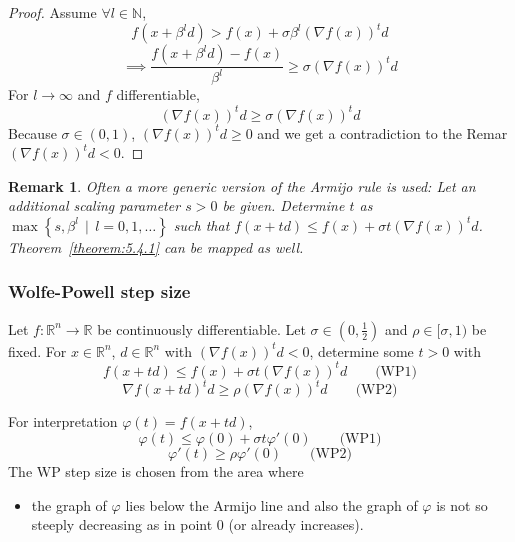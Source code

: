 \documentclass[a4paper]{article}
\numberwithin{lecref}{subsection}
\newtheorem*{Remark}{Remark}
\newcommand{\SetDef}[2]{\left\{#1\,\mid\,#2\right\}}
\begin{document}
\begin{proof}
	Assume $\forall l \in \mathbb N$,
	\[ f(x + \beta^l d) > f(x) + \sigma \beta^l\left(\nabla f(x)\right)^t d \]
	\[ \implies \frac{f(x + \beta^l d) - f(x)}{\beta^l} \geq \sigma \left(\nabla f(x)\right)^t d \]
	For $l \to \infty$ and $f$ differentiable,
	\[ (\nabla f(x))^t d \geq \sigma (\nabla f(x))^t d \]
	Because $\sigma \in (0, 1)$, $(\nabla f(x))^t d \geq 0$ and we get a contradiction to the Remar $(\nabla f(x))^t d < 0$.
\end{proof}

\begin{Remark}
	Often a more generic version of the Armijo rule is used: Let an additional scaling parameter $s > 0$ be given.
	Determine $t$ as $\max\SetDef{s, \beta^l}{l = 0, 1, \dots}$ such that $f(x + td) \leq f(x) + \sigma t\left(\nabla f(x)\right)^t d$.
	Theorem~\ref{theorem:5.4.1} can be mapped as well.
\end{Remark}

\subsubsection{Wolfe-Powell step size}
\label{section:5.4.2}

Let $f: \mathbb R^n \to \mathbb R$ be continuously differentiable. Let $\sigma \in (0, \frac12)$ and $\rho \in [\sigma, 1)$ be fixed.
For $x \in \mathbb R^n$, $d \in \mathbb R^n$ with $\left(\nabla f(x)\right)^t d < 0$, determine some $t > 0$ with
\[ f(x + td) \leq f(x) + \sigma t \left(\nabla f(x)\right)^t d \qquad \text{(WP1)} \]
\[ \nabla f(x + td)^t d \geq \rho \left(\nabla f(x)\right)^t d \qquad \text{(WP2)} \]

For interpretation $\varphi(t) = f(x + td)$,
\[ \varphi(t) \leq \varphi(0) + \sigma t \varphi'(0) \qquad \text{(WP1)} \]
\[ \varphi'(t) \geq \rho \varphi'(0) \qquad \text{(WP2)} \]
The WP step size is chosen from the area where
\begin{itemize}
	\item the graph of $\varphi$ lies below the Armijo line and also the graph of $\varphi$ is not so steeply decreasing as in point $0$ (or already increases).
\end{itemize}
\end{document}
